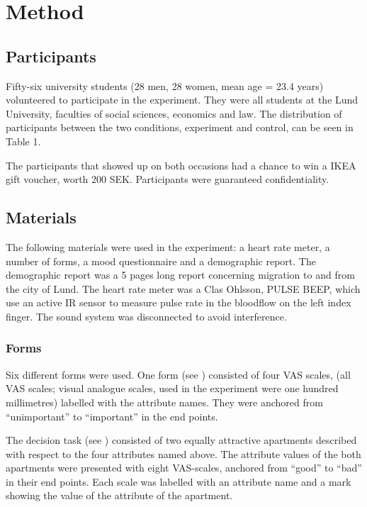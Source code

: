 \section{Method}

\subsection{Participants}

Fifty-six university students (28 men, 28 women, mean age = 23.4
years) volunteered to participate in the experiment.  They were all
students at the Lund University, faculties of social sciences,
economics and law.  The distribution of participants between the two
conditions, experiment and control, can be seen in Table 1.



The participants that showed up on both occasions had a chance to win
a IKEA gift voucher, worth 200 SEK.  Participants were guaranteed
confidentiality.


\subsection{Materials}

The following materials were used in the experiment: a heart rate
meter, a number of forms, a mood questionnaire and a demographic
report.  The demographic report was a 5 pages long report concerning
migration to and from the city of Lund.  The heart rate meter was a
Clas Ohlsson, PULSE BEEP, which use an active IR sensor to measure
pulse rate in the bloodflow on the left index finger.  The sound
system was disconnected to avoid interference.

\subsubsection{Forms} Six different forms were used.  One form (see )
consisted of four VAS scales, (all VAS scales; visual analogue scales,
used in the experiment were one hundred millimetres) labelled with the
attribute names.  They were anchored from ``unimportant'' to
``important'' in the end points.

The decision task (see ) consisted of two equally attractive
apartments described with respect to the four attributes named above.
The attribute values of the both apartments were presented with eight
VAS-scales, anchored from ``good'' to ``bad'' in their end points.  Each
scale was labelled with an attribute name and a mark showing the value
of the attribute of the apartment.

